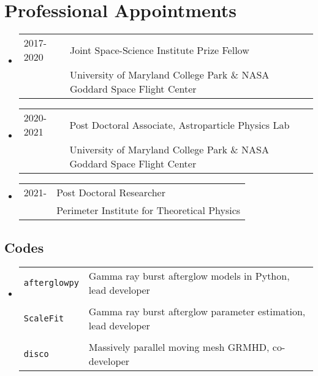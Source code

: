 \section*{Professional Appointments} %
\begin{itemize}
\item \begin{tabular}{ll}
2017-2020 & Joint Space-Science Institute Prize Fellow \\
	 & University of Maryland College Park \& NASA Goddard Space Flight Center\\
\end{tabular}
\item \begin{tabular}{ll}
2020-2021 & Post Doctoral Associate, Astroparticle Physics Lab\\
	  & University of Maryland College Park \& NASA Goddard Space Flight Center\\
\end{tabular}
\item \begin{tabular}{ll}
2021-\hphantom{2020} & Post Doctoral Researcher\\
	  & Perimeter Institute for Theoretical Physics
\end{tabular}
\end{itemize}


\subsection*{Codes}
\begin{itemize}
\item \begin{tabular}{ll}
\texttt{afterglowpy} & Gamma ray burst afterglow models in Python, lead developer\\
& \\
\texttt{ScaleFit} & Gamma ray burst afterglow parameter estimation, lead developer\\
& \\
\texttt{disco} & Massively parallel moving mesh GRMHD, co-developer
\end{tabular}
\end{itemize}

